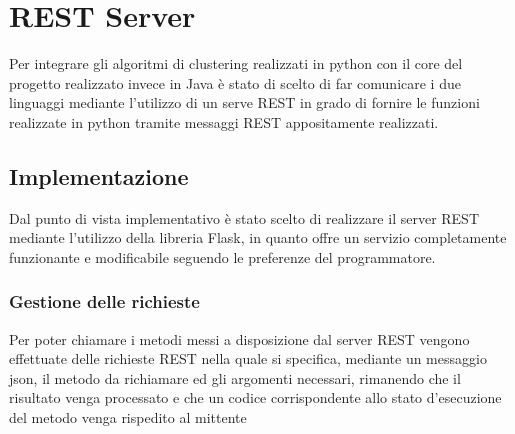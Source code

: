 \chapter{REST Server}
Per integrare gli algoritmi di clustering realizzati in python con il core del progetto realizzato invece in Java è stato di scelto di far comunicare i due linguaggi
mediante l'utilizzo di un serve REST in grado di fornire le funzioni realizzate in python tramite messaggi REST appositamente realizzati.
\section{Implementazione}
Dal punto di vista implementativo è stato scelto di realizzare il server REST mediante l'utilizzo della libreria Flask, in quanto offre un servizio completamente funzionante e
modificabile seguendo le preferenze del programmatore.
\subsection{Gestione delle richieste}
Per poter chiamare i metodi messi a disposizione dal server REST vengono effettuate delle richieste REST nella quale si specifica, mediante un messaggio json, il metodo da richiamare ed gli argomenti necessari, rimanendo
che il risultato venga processato e che un codice corrispondente allo stato d'esecuzione del metodo venga rispedito al mittente

